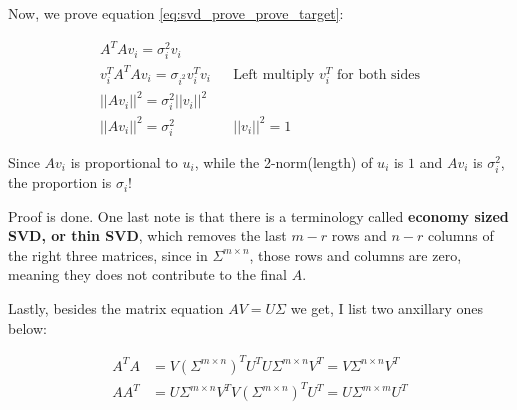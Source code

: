\documentclass[a4paper]{book}
\newenvironment{proof}[1][Proof]{\begin{trivlist}
\item[\hskip \labelsep {\bfseries #1}]}{\end{trivlist}}
\begin{document}
\begin{proof}
        Now, we prove equation \ref{eq:svd_prove_prove_target}:

        \begin{align*}
          A^{T}Av_{i} = \sigma_{i}^{2}v_{i}    
            && \\
          v_{i}^{T}A^{T}Av_{i} = \sigma_{i^{2}}v_{i}^{T}v_{i}    
            && \text{Left multiply $v_{i}^{T}$ for both sides}\\
          || Av_{i} ||^{2} = \sigma_{i}^{2}|| v_{i} ||^{2}    
            && \\
          || Av_{i} ||^{2} = \sigma_{i}^{2}    
            && || v_{i} ||^{2} = 1
        \end{align*}

        Since $Av_{i}$ is proportional to $u_{i}$, while the 2-norm(length) of
        $u_{i}$ is $1$ and $Av_{i}$ is $\sigma_{i}^{2}$, the proportion
        is $\sigma_{i}$!

        Proof is done. One last note is that there is a terminology
        called \textbf{economy sized SVD, or thin SVD}, which removes
        the last $m - r$ rows and $n -r$ columns of the right three
        matrices, since in $\Sigma^{m \times n}$, those rows and columns
        are zero, meaning they does not contribute to the final $A$.

        Lastly, besides the matrix equation $AV = U\Sigma$ we get, I
        list two anxillary ones below:

        \begin{align*}
          A^{T}A &= V(\Sigma^{m \times n})^{T}U^{T}U\Sigma^{m \times n} V^{T} = V\Sigma^{n \times n}V^{T}\\
          AA^{T} &= U\Sigma^{m \times n} V^{T}V(\Sigma^{m \times n})^{T}U^{T} = U\Sigma^{m \times m}U^{T}
        \end{align*}


\end{proof}
\end{document}
